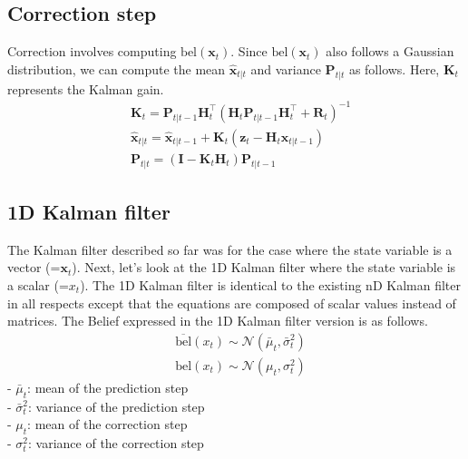 \documentclass[10pt]{article}
\begin{document}
	\subsection{Correction step}
	Correction involves computing $\text{bel}(\mathbf{x}_{t})$. Since $\text{bel}(\mathbf{x}_{t})$ also follows a Gaussian distribution, we can compute the mean $\hat{\mathbf{x}}_{t|t}$ and variance $\mathbf{P}_{t|t}$ as follows. Here, $\mathbf{K}_{t}$ represents the Kalman gain.
	\begin{equation}
		\boxed{ \begin{aligned}
				&     \mathbf{K}_{t} = \mathbf{P}_{t|t-1}\mathbf{H}_{t}^{\intercal}(\mathbf{H}_{t}\mathbf{P}_{t|t-1}\mathbf{H}_{t}^{\intercal} + \mathbf{R}_{t})^{-1} \\
				& \hat{\mathbf{x}}_{t|t}  = \hat{\mathbf{x}}_{t|t-1} + \mathbf{K}_{t}( \mathbf{z}_{t} - \mathbf{H}_{t}\hat{\mathbf{x}}_{t|t-1}) \\
				&     \mathbf{P}_{t|t}    = (\mathbf{I} - \mathbf{K}_{t}\mathbf{H}_{t})\mathbf{P}_{t|t-1}
		\end{aligned} }
	\end{equation}
	
	\subsection{1D Kalman filter}
	The Kalman filter described so far was for the case where the state variable is a vector (=$\mathbf{x}_t$). Next, let's look at the 1D Kalman filter where the state variable is a scalar (=$x_t$). The 1D Kalman filter is identical to the existing nD Kalman filter in all respects except that the equations are composed of scalar values instead of matrices. The Belief expressed in the 1D Kalman filter version is as follows.
	\begin{equation} 
		\begin{aligned} 
			& \overline{\text{bel}}(x_{t}) \sim \mathcal{N}(\bar{\mu}_t, \bar{\sigma}^2_t) \\
			& \text{bel}(x_{t}) \sim \mathcal{N}(\mu_{t}, \sigma^2_{t})
		\end{aligned} 
	\end{equation}
	- $\bar{\mu}_t$: mean of the prediction step \\
	- $\bar{\sigma}^2_t$: variance of the prediction step \\
	- ${\mu}_t$: mean of the correction step \\
	- ${\sigma}^2_t$: variance of the correction step \\
	
\end{document}
